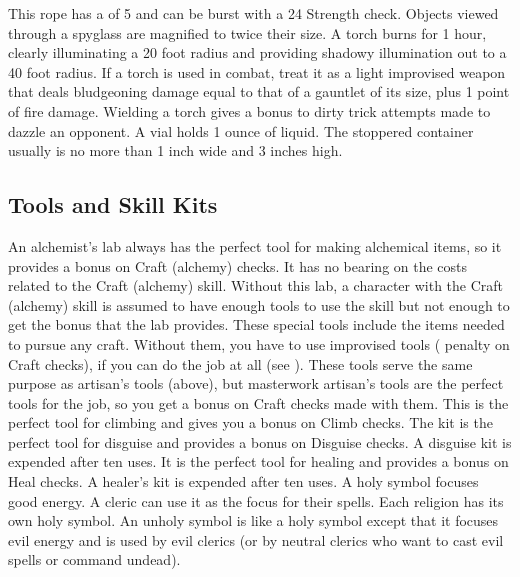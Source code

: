          This rope has a  of 5 and can be burst with a  24 Strength check.
         Objects viewed through a spyglass are magnified to twice their size.
         A torch burns for 1 hour, clearly illuminating a 20 foot radius and providing shadowy illumination out to a 40 foot radius. If a torch is used in combat, treat it as a light improvised weapon that deals bludgeoning damage equal to that of a gauntlet of its size, plus 1 point of fire damage. Wielding a torch gives a  bonus to dirty trick attempts made to dazzle an opponent.
         A vial holds 1 ounce of liquid. The stoppered container usually is no more than 1 inch wide and 3 inches high.

    \subsection{Tools and Skill Kits}
         An alchemist's lab always has the perfect tool for making alchemical items, so it provides a  bonus on Craft (alchemy) checks. It has no bearing on the costs related to the Craft (alchemy) skill. Without this lab, a character with the Craft (alchemy) skill is assumed to have enough tools to use the skill but not enough to get the  bonus that the lab provides.
         These special tools include the items needed to pursue any craft. Without them, you have to use improvised tools ( penalty on Craft checks), if you can do the job at all (see ).
         These tools serve the same purpose as artisan's tools (above), but masterwork artisan's tools are the perfect tools for the job, so you get a  bonus on Craft checks made with them.
         This is the perfect tool for climbing and gives you a  bonus on Climb checks.
         The kit is the perfect tool for disguise and provides a  bonus on Disguise checks. A disguise kit is expended after ten uses.
         It is the perfect tool for healing and provides a  bonus on Heal checks. A healer's kit is expended after ten uses.
         A holy symbol focuses good energy. A cleric can use it as the focus for their spells. Each religion has its own holy symbol.
         An unholy symbol is like a holy symbol except that it focuses evil energy and is used by evil clerics (or by neutral clerics who want to cast evil spells or command undead).
